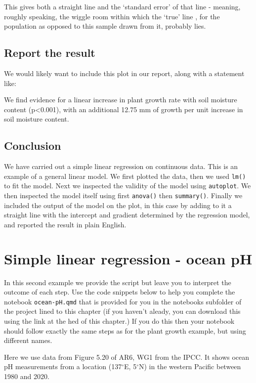 \documentclass[
  letterpaper,
  DIV=11,
  numbers=noendperiod]{scrreprt}
\begin{document}
This gives both a straight line and the `standard error' of that line -
meaning, roughly speaking, the wiggle room within which the `true' line
, for the population as opposed to this sample drawn from it, probably
lies.

\subsection{Report the result}\label{report-the-result}

We would likely want to include this plot in our report, along with a
statement like:

We find evidence for a linear increase in plant growth rate with soil
moisture content (p\textless0.001), with an additional 12.75 mm of
growth per unit increase in soil moisture content.

\subsection{Conclusion}\label{conclusion-1}

We have carried out a simple linear regression on continuous data. This
is an example of a general linear model. We first plotted the data, then
we used \texttt{lm()} to fit the model. Next we inspected the validity
of the model using \texttt{autoplot}. We then inspected the model itself
using first \texttt{anova()} then \texttt{summary()}. Finally we
included the output of the model on the plot, in this case by adding to
it a straight line with the intercept and gradient determined by the
regression model, and reported the result in plain English.

\section{Simple linear regression - ocean
pH}\label{simple-linear-regression---ocean-ph}

In this second example we provide the script but leave you to interpret
the outcome of each step. Use the code snippets below to help you
complete the notebook \texttt{ocean-pH.qmd} that is provided for you in
the notebooks subfolder of the project lined to this chapter (if you
haven't aleady, you can download this using the link at the hed of this
chapter.) If you do this then your notebook should follow exactly the
same steps as for the plant growth example, but using different names.

Here we use data from Figure 5.20 of AR6, WG1 from the IPCC. It shows
ocean pH measurements from a location (137\(^{\circ}\)E, 5\(^{\circ}\)N)
in the western Pacific between 1980 and 2020.
\end{document}
